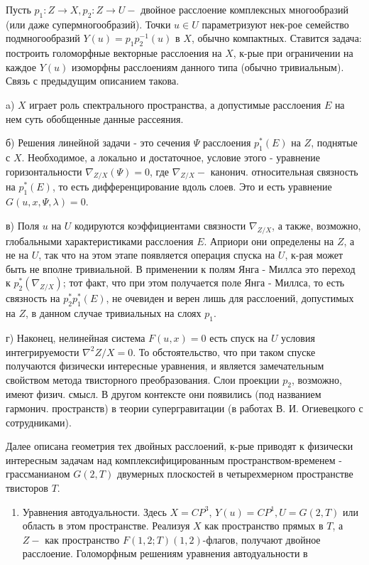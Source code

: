 \documentclass[10pt]{article}
\begin{document}
Пусть $p_{1}: Z \rightarrow X, p_{2}: Z \rightarrow U-$ двойное расслоение комплексных многообразий (или даже супермногообразий). Точки $u \in U$ параметризуют нек-рое семейство подмногообразий $Y(u)=p_{1} p_{2}^{-1}(u)$ в $X$, обычно компактных. Ставится задача: построить голоморфные векторные расслоения на $X$, к-рые при ограничении на каждое $Y(u)$ изоморфны расслоениям данного типа (обычно тривиальным). Связь с предыдущим описанием такова.



a) $X$ играет роль спектрального пространства, а допустимые расслоения $E$ на нем суть обобщенные данные рассеяния.



б) Решения линейной задачи - это сечения $\Psi$ расслоения $p_{1}^{*}(E)$ на $Z$, поднятые с $X$. Необходимое, а локально и достаточное, условие этого - уравнение горизонтальности $\nabla_{Z / X}(\Psi)=0$, где $\nabla_{Z / X}-$ канонич. относительная связность на $p_{1}^{*}(E)$, то есть дифференцирование вдоль слоев. Это и есть уравнение $G(u, x, \Psi, \lambda)=0$.



в) Поля $u$ на $U$ кодируются коэффициентами связности $\nabla_{Z / X}$, а также, возможно, глобальными характеристиками расслоения $E$. Априори они определены на $Z$, а не на $U$, так что на этом этапе появляется операция спуска на $U$, к-рая может быть не вполне тривиальной. В применении к полям Янга - Миллса это переход к $p_{2}^{*}\left(\nabla_{Z / X}\right)$; тот факт, что при этом получается поле Янга - Миллса, то есть связность на $p_{2}^{*} p_{1}^{*}(E)$, не очевиден и верен лишь для расслоений, допустимых на $Z$, в данном случае тривиальных на слоях $p_{1}$.



г) Наконец, нелинейная система $F(u, x)=0$ есть спуск на $U$ условия интегрируемости $\nabla^{2} Z / X=0$. То обстоятельство, что при таком спуске получаются физически интересные уравнения, и является замечательным свойством метода твисторного преобразования. Слои проекции $p_{2}$, возможно, имеют физич. смысл. В другом контексте они появились (под названием гармонич. пространств) в теории супергравитации (в работах В. И. Огиевецкого с сотрудниками).



Далее описана геометрия тех двойных расслоений, к-рые приводят к физически интересным задачам над комплексифицированным пространством-временем - грассманианом $G(2, T)$ двумерных плоскостей в четырехмерном пространстве твисторов $T$.



\begin{enumerate}

  \item Уравнения автодуальности. Здесь $X=C P^{3}$, $Y(u)=C P^{1}, U=G(2, T)$ или область в этом пространстве. Реализуя $X$ как пространство прямых в $T$, а $Z-$ как пространство $F(1,2 ; T)(1,2)$-флагов, получают двойное расслоение. Голоморфным решениям уравнения автодуальности в

\end{enumerate}
\end{document}

